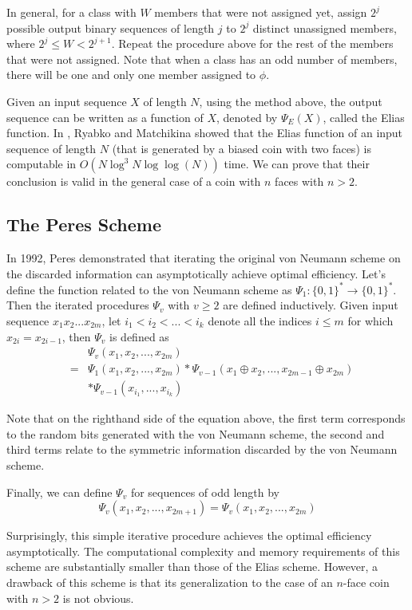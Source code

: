 \documentclass[journal]{IEEEtran}
\begin{document}
In general, for a class with $W$ members that were not assigned yet, assign $2^j$ possible output binary sequences of length $j$ to $2^j$ distinct unassigned members, where
$2^j\leq W<2^{j+1}$.  Repeat the procedure above for the rest of the members
that were not assigned. Note that when a class has an odd number of members, there will be one and only one member assigned to $\phi$.

Given an input sequence $X$ of length $N$, using the method above, the output sequence can be written as a function of $X$, denoted by $\Psi_{E}(X)$, called the Elias function.
In \cite{Ryabko2000}, Ryabko and Matchikina showed that the Elias function of an input sequence
of length $N$ (that is generated by a biased coin with two faces) is computable in $O(N \log^3 N \log\log (N))$ time.
We can prove that their conclusion is valid in the general case of a coin with $n$ faces with $n>2$.

\subsection{The Peres Scheme}

In 1992, Peres \cite{Peres1992} demonstrated that iterating the original von Neumann scheme
on the discarded information can asymptotically achieve optimal efficiency.
Let's define the function related to the von Neumann scheme as $\Psi_1: \{0,1\}^*\rightarrow
\{0,1\}^*$. Then the iterated procedures $\Psi_v$ with $v\geq 2$ are defined inductively.
Given input sequence $x_1x_2...x_{2m}$, let $i_1<i_2<...<i_k$ denote all the indices $i\leq m$ for which $x_{2i}=x_{2i-1}$, then $\Psi_v$ is defined as
\begin{eqnarray*}
 && \Psi_v(x_1,x_2,...,x_{2m}) \\
  &=& \Psi_1(x_1,x_2,...,x_{2m})*\Psi_{v-1}(x_1\oplus x_2, ..., x_{2m-1}\oplus x_{2m}) \\
   && *\Psi_{v-1}(x_{i_1}, ..., x_{i_k})
\end{eqnarray*}

Note that on the righthand side of the equation above, the first term corresponds to the random bits
generated with the von Neumann scheme, the second and third terms relate
to the symmetric information discarded by the von Neumann scheme.

Finally, we can define $\Psi_v$ for sequences of odd length by
$$\Psi_v(x_1,x_2,...,x_{2m+1})=\Psi_v(x_1,x_2,...,x_{2m})$$

Surprisingly, this simple iterative procedure achieves the optimal efficiency asymptotically.
The computational complexity and memory requirements of this scheme are substantially smaller than those of the Elias scheme. However, a drawback of this scheme is that its generalization to the case of an $n$-face coin with $n>2$ is not obvious.
\end{document}

